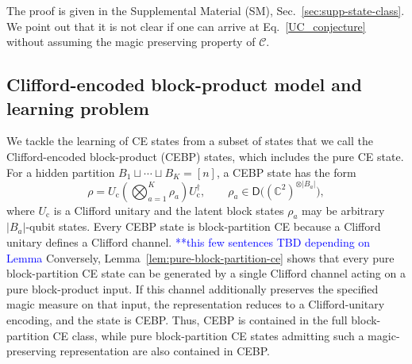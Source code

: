 \documentclass[
  aps,
  prx,
  reprint,
  superscriptaddress,
  amsmath,
  amssymb,
  nofootinbib,
  longbibliography
]{revtex4-2}
\newcommand{\D}{\mathsf{D}}
\newcommand{\map}[1]{\mathcal{#1}}
\newcommand{\QZ}[1]{{{\textcolor{blue}{#1}}}}
\begin{document}
\noindent The proof is given in the Supplemental Material (SM),
Sec.~\ref{sec:supp-state-class}. We point out that it is not clear if one can arrive at Eq.~\eqref{UC_conjecture} without assuming the magic preserving property of $\map C$. 

\subsection{Clifford-encoded block-product model and learning problem}

We tackle the learning of CE states from a subset of states that we call the Clifford-encoded block-product (CEBP) states, which includes the pure CE state.  For a hidden partition
$B_1\sqcup\cdots\sqcup B_K=[n]$, a CEBP state has the form
\begin{equation}
\rho
=
U_{\mathrm c}
\left(
\bigotimes_{a=1}^{K}\rho_a
\right)
U_{\mathrm c}^{\dagger},
\qquad
\rho_a\in \D\!\bigl((\mathbb C^2)^{\otimes |B_a|}\bigr),
\label{eq:clifford-encoded-block-product}
\end{equation}
where $U_{\mathrm c}$ is a Clifford unitary and the latent block states
$\rho_a$ may be arbitrary $|B_a|$-qubit states.  
Every CEBP state is block-partition CE because a Clifford unitary defines a
Clifford channel.  \QZ{**this few sentences TBD depending on Lemma }Conversely, Lemma~\ref{lem:pure-block-partition-ce} shows
that every pure block-partition CE state can be generated by a single Clifford
channel acting on a pure block-product input.  If this channel additionally
preserves the specified magic measure on that input, the representation reduces
to a Clifford-unitary encoding, and the state is CEBP.  Thus, CEBP is contained
in the full block-partition CE class, while pure block-partition CE states
admitting such a magic-preserving representation are also contained in CEBP.
\end{document}
